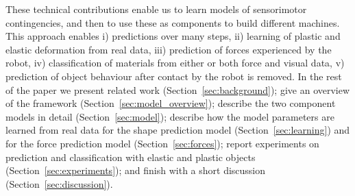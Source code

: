 \documentclass[journal]{IEEEtran}
\newcommand{\alref}[1]{Algorithm~\ref{#1}}
\newcounter{algorithm}
\newenvironment{algorithmicieee}[1]
  {\refstepcounter{algorithm}
   \begin{lrbox}{\ieeealgbox}
   \begin{minipage}{\dimexpr\columnwidth-2\fboxsep-2\fboxrule}
   \textbf{Algorithm \arabic{algorithm}:} \textit{#1} \par
   \begin{algorithmic}[1]}
  {\end{algorithmic}
   \end{minipage}
   \end{lrbox}\noindent\fbox{\usebox{\ieeealgbox}}}
\newcommand{\comment}[1]{{\color{red} #1}}
\begin{document}


\comment{These technical contributions} enable us to learn models of sensorimotor contingencies, and then to use these as components to build different machines. This approach enables i) predictions over many steps, ii) learning of plastic and elastic deformation from real data, iii) prediction of forces experienced by the robot, iv) classification of materials from either or both force and visual data, v) prediction of object behaviour after contact by the robot is removed. In the rest of the paper we present related work (Section~\ref{sec:background}); give an overview of the framework (Section~\ref{sec:model_overview}); describe the two component models in detail (Section~\ref{sec:model}); describe how the model parameters are learned from real data for the shape prediction model (Section~\ref{sec:learning}) and for the force prediction model (Section~\ref{sec:forces}); report experiments on prediction and classification with elastic and plastic objects (Section~\ref{sec:experiments}); and finish with a short discussion (Section~\ref{sec:discussion}).
\end{document}
